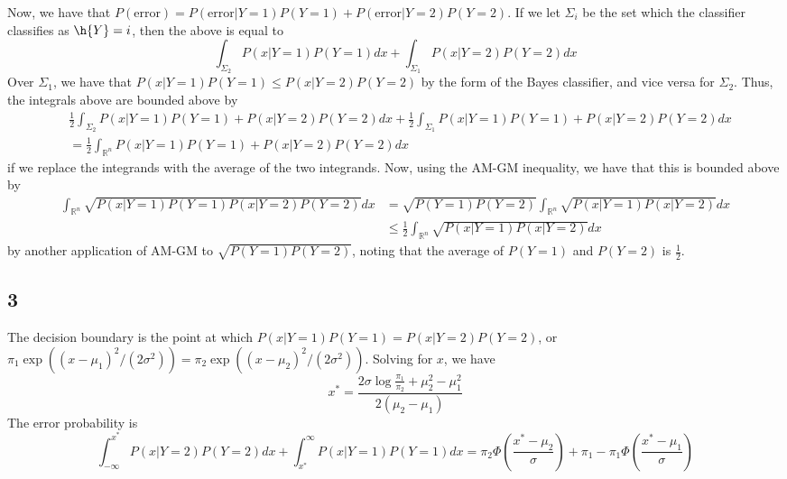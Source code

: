 \documentclass{article}
\newcommand{\rn}{\mathbb{R}}
\begin{document}
Now, we have that $P(\text{error})=P(\text{error}|Y=1)P(Y=1)+P(\text{error}|Y=2)P(Y=2)$. If we let $\Sigma_i$ be the set which the classifier classifies as $\h{Y}=i$, then the above is equal to 
\[\int_{\Sigma_2}P(x|Y=1)P(Y=1)dx+\int_{\Sigma_1}P(x|Y=2)P(Y=2)dx\]
Over $\Sigma_1$, we have that $P(x|Y=1)P(Y=1)\leq P(x|Y=2)P(Y=2)$ by the form of the Bayes classifier, and vice versa for $\Sigma_2$. Thus, the integrals above are bounded above by
\begin{align*}
&\frac{1}{2}\int_{\Sigma_2}P(x|Y=1)P(Y=1)+P(x|Y=2)P(Y=2)dx+ \frac{1}{2}\int_{\Sigma_1}P(x|Y=1)P(Y=1)+P(x|Y=2)P(Y=2)dx\\
    &=\frac{1}{2}\int_{\rn^n}P(x|Y=1)P(Y=1)+P(x|Y=2)P(Y=2)dx
\end{align*}
if we replace the integrands with the average of the two integrands. Now, using the AM-GM inequality, we have that this is bounded above by 
\begin{align*}
\int_{\rn^n}\sqrt{P(x|Y=1)P(Y=1)P(x|Y=2)P(Y=2)}dx&=\sqrt{P(Y=1)P(Y=2)}\int_{\rn^n}\sqrt{P(x|Y=1)P(x|Y=2)}dx\\
&\leq\frac{1}{2}\int_{\rn^n}\sqrt{P(x|Y=1)P(x|Y=2)}dx
\end{align*}
by another application of AM-GM to $\sqrt{P(Y=1)P(Y=2)}$, noting that the average of $P(Y=1)$ and $P(Y=2)$ is $\frac{1}{2}$.
\subsection*{3}
The decision boundary is the point at which $P(x|Y=1)P(Y=1)=P(x|Y=2)P(Y=2)$, or $\pi_1\exp\left((x-\mu_1)^2/(2\sigma^2)\right)=\pi_2\exp\left((x-\mu_2)^2/(2\sigma^2)\right)$. Solving for $x$, we have 
\[x^*=\frac{2\sigma\log\frac{\pi_1}{\pi_2}+\mu_2^2-\mu_1^2}{2(\mu_2-\mu_1)}\]
The error probability is
\[\int_{-\infty}^{x^*}P(x|Y=2)P(Y=2)dx+\int_{x^*}^\infty P(x|Y=1)P(Y=1)dx=\pi_2\Phi\left(\frac{x^*-\mu_2}{\sigma}\right)+\pi_1-\pi_1\Phi\left(\frac{x^*-\mu_1}{\sigma}\right)\]
\end{document}
